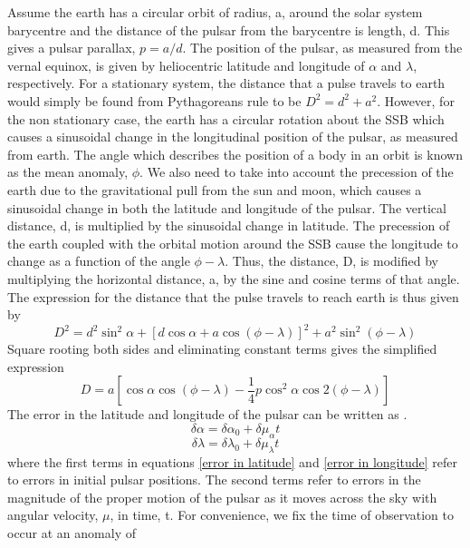 \documentclass[12pt]{article}
\begin{document}
	\noindent Assume the earth has a circular orbit of radius, a, around the solar system barycentre and the distance of the pulsar from the barycentre is length, d. This gives a pulsar parallax, $p=a/d$. The position of the pulsar, as measured from the vernal equinox, is given by heliocentric latitude and longitude of $\alpha$ and $\lambda$, respectively. For a stationary system, the distance that a pulse travels to earth would simply be found from Pythagoreans rule to be $D^2=d^2+a^2$. However, for the non stationary case, the earth has a circular rotation about the SSB which causes a sinusoidal change in the longitudinal position of the pulsar, as measured from earth. The angle which describes the position of a body in an orbit is known as the mean anomaly, $\phi$.  We also need to take into account the precession of the earth due to the gravitational pull from the sun and moon, which causes a sinusoidal change in both the latitude and longitude of the pulsar. The vertical distance, d, is multiplied by the sinusoidal change in latitude. The precession of the earth coupled with the orbital motion around the SSB cause the longitude to change as a function of the angle $\phi-\lambda$. Thus, the distance, D, is modified by multiplying the horizontal distance, a, by the sine and cosine terms of that angle. The expression for the distance that the pulse travels to reach earth is thus given by
	\begin{equation}\label{D eqn}
	D^2=d^2 \sin^2{\alpha}+[d \cos{\alpha}+a \cos(\phi-\lambda)]^2+a^2 \sin^2(\phi-\lambda)
	\end{equation}
	Square rooting both sides and eliminating constant terms gives the simplified expression 
	\begin{equation}\label{simplified D eqn}
	D=a[\cos \alpha \cos(\phi-\lambda)-\frac{1}{4}p\cos^2{\alpha} \cos{2(\phi-\lambda)}]
	\end{equation}
	The error in the latitude and longitude of the pulsar can be written as \cite{blandford1976arrival}.
	\begin{equation}\label{error in latitude}
	\delta\alpha=\delta\alpha_{0}+\delta\mu_{\alpha}t
	\end{equation}
	\begin{equation}\label{error in longitude}
	\delta\lambda=\delta\lambda_{0}+\delta\mu_{\lambda}t
	\end{equation}
	where the first terms in equations \ref{error in latitude} and \ref{error in longitude} refer to errors in initial pulsar positions. The second terms refer to errors in the magnitude of the proper motion of the pulsar as it moves across the sky with angular velocity, $\mu$, in time, t. For convenience, we fix the time of observation to occur at an anomaly of 
\end{document}
